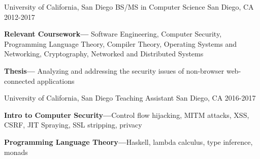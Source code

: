


\begin{cventries}


\cventry
{University of California, San Diego} %
{BS/MS in Computer Science} %
{San Diego, CA} %
{2012-2017} %
{ %
\begin{cvitems}
\item {
  \textbf{Relevant Coursework---} Software Engineering, Computer Security,
  Programming Language Theory, Compiler Theory, Operating Systems and
  Networking, Cryptography, Networked and Distributed Systems
}
\item {
  \textbf{Thesis---} Analyzing and addressing the security issues of non-browser
  web-connected applications
}
\end{cvitems}
}


\cventry
{University of California, San Diego} %
{Teaching Assistant} %
{San Diego, CA} %
{2016-2017} %
{ %
\begin{cvitems}
\item {\textbf{Intro to Computer Security---}Control flow hijacking, MITM attacks, XSS, CSRF, JIT Spraying, SSL stripping, privacy}
\item {\textbf{Programming Language Theory---}Haskell, lambda calculus, type inference, monads}
\end{cvitems}
}


\end{cventries}
